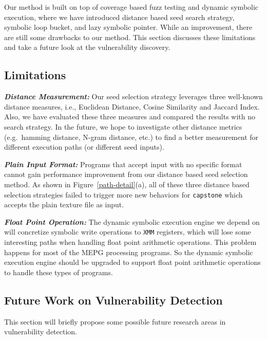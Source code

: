 Our method is built on top of coverage based fuzz testing and dynamic 
symbolic execution, where we have introduced distance based seed search 
strategy, symbolic loop bucket, and lazy symbolic pointer. While an 
improvement, there are still some drawbacks to our method. This section 
discusses these limitations and take a future look at 
the vulnerability discovery.
 
\subsection{Limitations}

\noindent\textit{\textbf{Distance Measurement:}} Our seed selection 
strategy leverages three well-known distance measures, i.e., 
Euclidean Distance, Cosine Similarity and Jaccard Index. Also, 
we have evaluated these three measures and compared the results 
with no search strategy. In the future, we hope to investigate 
other distance metrics (e.g.\ hamming distance, N-gram distance, 
etc.) to find a better measurement for different execution paths 
(or different seed inputs). 

\noindent\textit{\textbf{Plain Input Format:}} Programs that accept 
input with no specific format cannot gain performance improvement 
from our distance based seed selection method. As shown in 
Figure~\ref{path-detail}(a), all of these three distance based 
selection strategies failed to trigger more new behaviors for 
\texttt{capstone} which accepts the plain texture file as input. 

\noindent\textit{\textbf{Float Point Operation:}} The dynamic 
symbolic execution engine we depend on will concretize symbolic 
write operations to \texttt{XMM} registers, which will lose some 
interesting paths when handling float point arithmetic operations. 
This problem happens for most of the MEPG processing programs. 
So the dynamic symbolic execution engine should be upgraded to 
support float point arithmetic operations to handle 
these types of programs.

\subsection{Future Work on Vulnerability Detection}
This section will briefly propose some possible future 
research areas in vulnerability detection.

